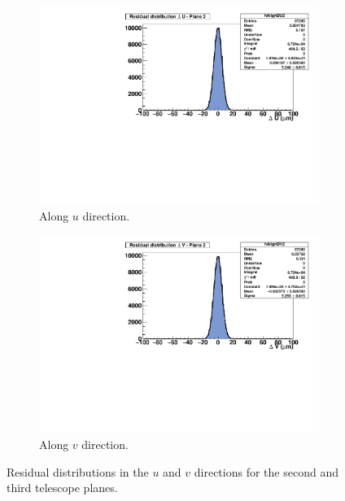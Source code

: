       \begin{figure}[!tbh]
        \centering
        \begin{subfigure}[t]{0.45\textwidth}
          \centering
          \includegraphics[width = 1.2\textwidth]{Pictures/deformation/residualUPl2_226056.pdf}
          \caption{Along $u$ direction.}
          \label{fig:alignmentPlane2}
        \end{subfigure}
        \hfill
        \begin{subfigure}[t]{0.45\textwidth}
          \centering
          \includegraphics[width = 1.2\textwidth]{Pictures/deformation/residualVPl2_226056.pdf}
          \caption{Along $v$ direction.}
          \label{fig:alignmentPlane3}
        \end{subfigure}
        \caption{Residual distributions in the $u$ and $v$ directions for the second and third telescope planes.}
        \label{fig:alignmentTelescope}
      \end{figure}

